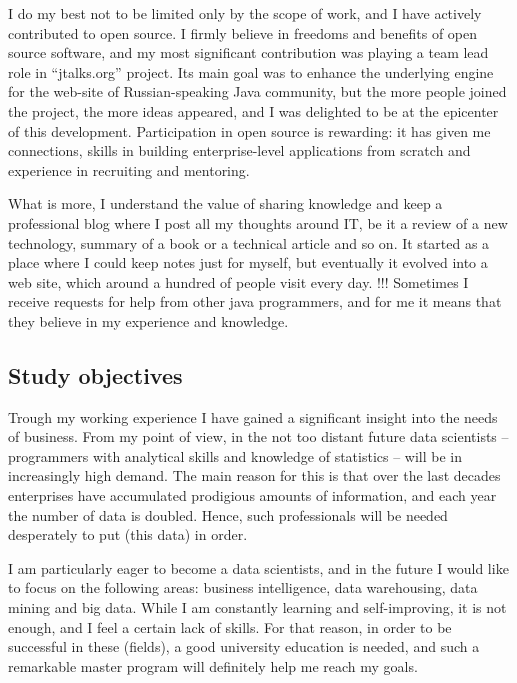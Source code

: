 \documentclass[a4paper,12pt]{article}
\begin{document}
I do my best not to be limited only by the scope of work, and I have actively contributed to open source. I firmly believe in freedoms and benefits of open source software, and my most significant contribution was playing a team lead role in ``jtalks.org'' project. Its main goal was to enhance the underlying engine for the web-site of Russian-speaking Java community, but the more people joined the project, the more ideas appeared, and I was delighted to be at the epicenter of this development. Participation in open source is rewarding: it has given me connections, skills in building enterprise-level applications from scratch and experience in recruiting and mentoring.

What is more, I understand the value of sharing knowledge and keep a professional blog where I post all my thoughts around IT, be it a review of a new technology, summary of a book or a technical article and so on. It started as a place where I could keep notes just for myself, but eventually it evolved into a web site, which around a hundred of people visit every day. !!! Sometimes I receive requests for help from other java programmers, and for me it means that they believe in my experience and knowledge.


\subsection*{Study objectives}

Trough my working experience I have gained a significant insight into the needs of business. From my point of view, in the not too distant future data scientists -- programmers with analytical skills and knowledge of statistics -- will be in increasingly high demand. The main reason for this is that over the last decades enterprises have accumulated prodigious amounts of information, and each year the number of data is doubled. Hence, such professionals will be needed desperately to put (this data) in order.

I am particularly eager to become a data scientists, and in the future I would like to focus on the following areas: business intelligence, data warehousing, data mining and big data. While I am constantly learning and self-improving, it is not enough, and I feel a certain lack of skills. For that reason, in order to be successful in these (fields), a good university education is needed, and such a remarkable master program will definitely help me reach my goals.
\end{document}
